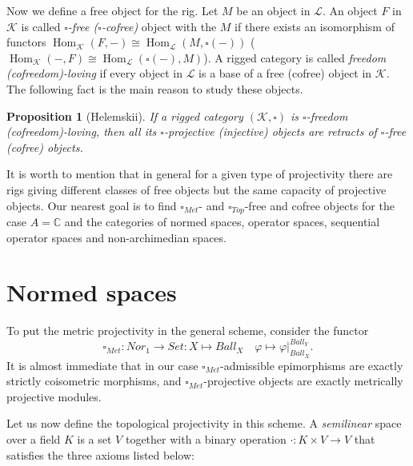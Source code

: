 \documentclass[a0b,landscape]{a0poster}
\newtheorem*{proposition}{Proposition}
\begin{document}
\begin{multicols}{4}
Now we define a free object for the rig. Let $M$ be an object in $\mathcal{L}$.
An object $F$ in $\mathcal{K}$ is called \textit{$\square$-free
($\square$-cofree)} object with the  $M$ if there exists an
isomorphism of functors
$\operatorname{Hom}_{\mathcal{K}}(F,-)
\cong\operatorname{Hom}_{\mathcal{L}}(M,\square(-))$
($\operatorname{Hom}_{\mathcal{K}}(-,F)
\cong\operatorname{Hom}_{\mathcal{L}}(\square(-),M)$).
A rigged category is called \textit{freedom (cofreedom)-loving} if every object
in $\mathcal{L}$ is a base of a free (cofree) object in $\mathcal{K}$. The
following fact is the main reason to study these objects.

\begin{proposition}[Helemskii] If a rigged category $(\mathcal{K},\square)$ is
$\square$-freedom (cofreedom)-loving, then all its $\square$-projective
(injective) objects are retracts of $\square$-free (cofree) objects.
\end{proposition}

It is worth to mention that in general for a given type of projectivity there
are rigs giving different classes of free objects but the same capacity of
projective objects. Our nearest goal is to find $\square_{Met}$- and
$\square_{Top}$-free and cofree objects for the case $A = \mathbb{C}$ and the
categories of normed spaces, operator spaces, sequential operator spaces and
non-archimedian spaces.










\section*{Normed spaces}

To put the metric projectivity in the general scheme, consider the functor
$$
\square_{Met}
:Nor_1\to Set
: X\mapsto Ball_X\quad \varphi\mapsto \varphi|_{Ball_X}^{Ball_Y}.
$$
It is almost immediate that in our case $\square_{Met}$-admissible epimorphisms
are exactly strictly coisometric morphisms, and $\square_{Met}$-projective
objects are exactly metrically projective modules.


Let us now define the topological projectivity in this scheme. A
\textit{semilinear} space over a field $K$ is a set $V$ together with a binary
operation $\cdot:K\times V\to V$ that satisfies the three axioms listed below:


\end{multicols}
\end{document}
